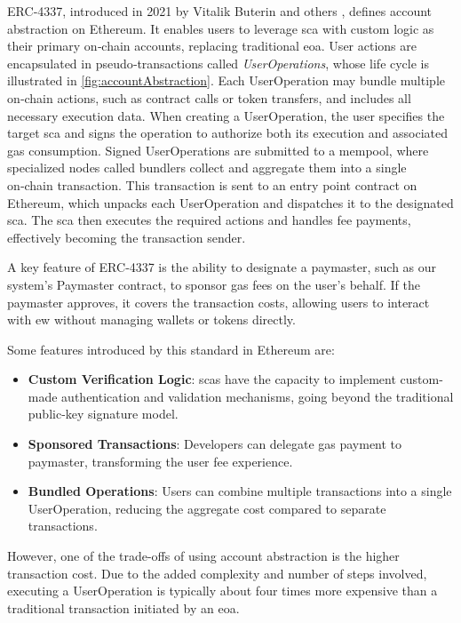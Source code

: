 ERC‑4337, introduced in 2021 by Vitalik Buterin and others \cite{buterin2021erc}, defines account abstraction on Ethereum. It enables users to leverage \gls{sca} with custom logic as their primary on‑chain accounts, replacing traditional \gls{eoa}. User actions are encapsulated in pseudo‑transactions called \textit{UserOperations}, whose life cycle is illustrated in \cref{fig:accountAbstraction}. Each UserOperation may bundle multiple on‑chain actions, such as contract calls or token transfers, and includes all necessary execution data. When creating a UserOperation, the user specifies the target \gls{sca} and signs the operation to authorize both its execution and associated gas consumption.
Signed UserOperations are submitted to a \gls{mempool}, where specialized nodes called bundlers collect and aggregate them into a single on‑chain transaction. This transaction is sent to an entry point contract on Ethereum, which unpacks each UserOperation and dispatches it to the designated \gls{sca}. The \gls{sca} then executes the required actions and handles fee payments, effectively becoming the transaction sender.

A key feature of ERC‑4337 is the ability to designate a paymaster, such as our system’s Paymaster contract, to sponsor gas fees on the user’s behalf. If the paymaster approves, it covers the transaction costs, allowing users to interact with \gls{ew} without managing wallets or tokens directly.

Some features introduced by this standard in Ethereum are:
\begin{itemize}
    \item \textbf{Custom Verification Logic}: \gls{sca}s have the capacity to implement custom-made authentication and validation mechanisms, going beyond the traditional public-key signature model.
    \item \textbf{Sponsored Transactions}: Developers can delegate gas payment to paymaster, transforming the user fee experience.
    \item \textbf{Bundled Operations}: Users can combine multiple transactions into a single UserOperation, reducing the aggregate cost compared to separate transactions.
\end{itemize}

However, one of the trade-offs of using account abstraction is the higher transaction cost. Due to the added complexity and number of steps involved, executing a UserOperation is typically about four times more expensive than a traditional transaction initiated by an \gls{eoa}.

